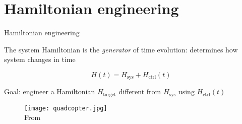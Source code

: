 \documentclass{beamer}
\begin{document}
\section{Hamiltonian engineering}


\begin{frame}{Hamiltonian engineering}


The system Hamiltonian is the \emph{generator} of time evolution: determines how system changes in time

\[
H(t) = H_{\text{sys}} + H_{\text{ctrl}}(t)
\]

Goal: engineer a Hamiltonian $H_{\text{target}}$ different from $H_{\text{sys}}$ using $H_{\text{ctrl}}(t)$

\begin{figure}
\centering
\texttt{[image: quadcopter.jpg]} \\
From \cite{quadcopter}
\end{figure}

%



\end{frame}
\end{document}
